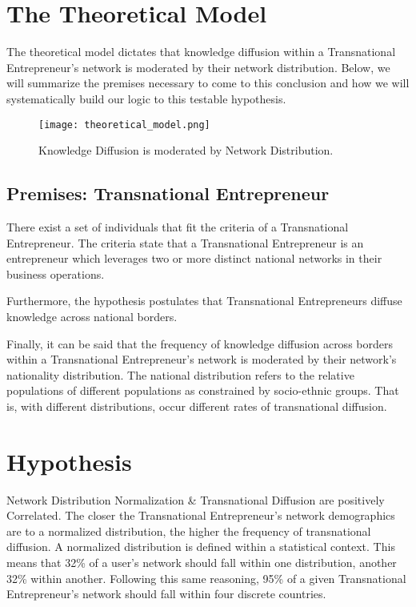 \section{The Theoretical Model}
The theoretical model dictates that knowledge diffusion within a
Transnational Entrepreneur's network is moderated by their network
distribution. Below, we will summarize the premises necessary to come
to this conclusion and how we will systematically build our logic to
this testable hypothesis.

\begin{figure}[!ht]
  \centering
  \texttt{[image: theoretical\_model.png]}
  \caption{Knowledge Diffusion is moderated by Network Distribution.}
\end{figure}

\subsection{Premises: Transnational Entrepreneur}
There exist a set of individuals that fit the criteria of a
Transnational Entrepreneur. The criteria state that a Transnational
Entrepreneur is an entrepreneur which leverages two or more distinct
national networks in their business operations.

Furthermore, the hypothesis postulates that Transnational
Entrepreneurs diffuse knowledge across national borders.

Finally, it can be said that the frequency of knowledge diffusion
across borders within a Transnational Entrepreneur's network is
moderated by their network's nationality distribution. The national
distribution refers to the relative populations of different
populations as constrained by socio-ethnic groups. That is, with
different distributions, occur different rates of transnational
diffusion.

\section{Hypothesis}
Network Distribution Normalization \& Transnational Diffusion are
positively Correlated. The closer the Transnational Entrepreneur's
network demographics are to a normalized distribution, the higher the
frequency of transnational diffusion. A normalized distribution is
defined within a statistical context. This means that 32\% of a user's
network should fall within one distribution, another 32\% within
another. Following this same reasoning, 95\% of a given Transnational
Entrepreneur's network should fall within four discrete countries.

